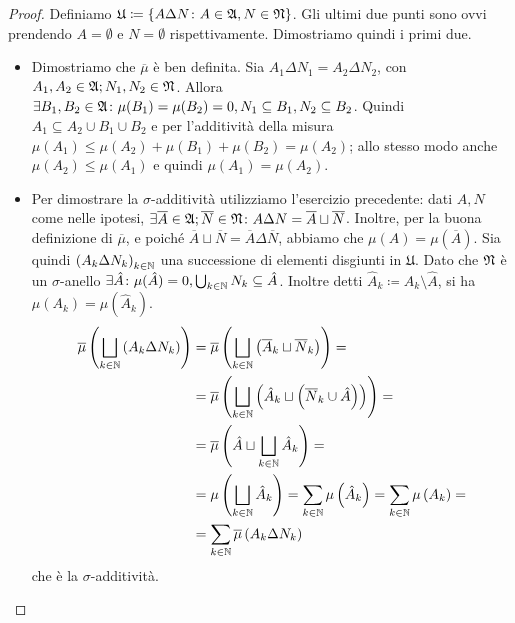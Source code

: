 \documentclass[../EserciziIstituzioniAnalisi.tex]{subfiles}
\begin{document}
\begin{proof}
  Definiamo $\mathfrak{U}\coloneqq \left\{A\Delta N\colon A\in\mathfrak A,N\in\mathfrak N\right\}$. Gli ultimi due punti sono ovvi prendendo $A=\emptyset$ e $N=\emptyset$ rispettivamente. Dimostriamo quindi i primi due.
  \begin{itemize}
    \item Dimostriamo che $\overline\mu$ è ben definita. Sia $A_1 \Delta N_1=A_2\Delta N_2$, con $A_1,A_2\in \mathfrak A; N_1,N_2\in\mathfrak N$. Allora $\exists B_1, B_2\in \mathfrak A\colon \mu(B_1)=\mu(B_2)=0, N_1\subseteq B_1, N_2\subseteq B_2$. Quindi $A_1\subseteq A_2\cup B_1 \cup B_2$ e per l'additività della misura $\mu(A_1)\leq \mu(A_2)+\mu(B_1)+\mu(B_2)=\mu(A_2)$; allo stesso modo anche $\mu(A_2)\leq \mu(A_1)$ e quindi $\mu(A_1)=\mu(A_2)$.
    \item Per dimostrare la $\sigma$-additività utilizziamo l'esercizio precedente: dati $A,N$ come nelle ipotesi, $\exists \overline A\in \mathfrak A; \overline N\in\mathfrak N \colon A \Delta N= \overline A \sqcup \overline N$. Inoltre, per la buona definizione di $\overline \mu$, e poiché $\overline A \sqcup \overline N=\overline A \Delta \overline N$, abbiamo che $\mu(A)=\mu(\overline A)$. Sia quindi $\left(A_k \Delta N_k \right)_{k\in \mathbb N}$ una successione di elementi disgiunti in $\mathfrak{U}$. Dato che $\mathfrak N$ è un $\sigma$-anello $\exists \hat A\colon \mu(\hat A)=0, \bigcup_{k \in \mathbb N} N_k\subseteq \hat A$. Inoltre detti $\hat A_k\coloneqq A_k \setminus \hat A$, si ha $\mu(A_k)=\mu(\hat A_k)$.
    \begin{equation*}
      \begin{aligned}
        \overline \mu\left(\bigsqcup_{k\in \mathbb N} \left( A_k \Delta N_k\right)\right)&=\overline \mu\left(\bigsqcup_{k\in \mathbb N} \left(\overline A_k \sqcup \overline N_k\right)\right)=\\
        &=\overline \mu\left(\bigsqcup_{k\in \mathbb N} \left(\hat A_k \sqcup \left(\overline N_k \cup\hat A \right)\right)\right)=\\
        &=\overline \mu\left(\hat A \sqcup \bigsqcup_{k\in \mathbb N} \hat A_k \right)=\\
        &=\mu\left(\bigsqcup_{k\in \mathbb N} \hat A_k\right)=\sum_{k \in \mathbb N}\mu\left(\hat A_k\right)=\sum_{k \in \mathbb N}\mu\left(A_k\right)=\\
        &=\sum_{k \in \mathbb N}\overline\mu\left(A_k \Delta N_k\right)
      \end{aligned}
    \end{equation*}
    che è la $\sigma$-additività.
  \end{itemize}
\end{proof}
\end{document}
